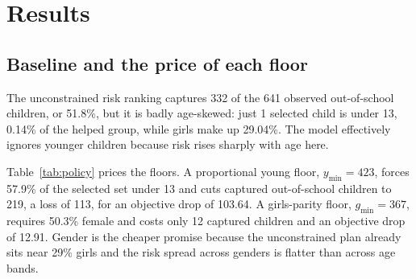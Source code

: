 \documentclass[12.1pt,a4paper]{article}
\begin{document}
\section{Results}

\subsection{Baseline and the price of each floor}

The unconstrained risk ranking captures 332 of the 641 observed out-of-school children, or 51.8\%, but it is badly age-skewed: just 1 selected child is under 13, 0.14\% of the helped group, while girls make up 29.04\%. The model effectively ignores younger children because risk rises sharply with age here.

Table~\ref{tab:policy} prices the floors. A proportional young floor, $y_{\min}=423$, forces 57.9\% of the selected set under 13 and cuts captured out-of-school children to 219, a loss of 113, for an objective drop of 103.64. A girls-parity floor, $g_{\min}=367$, requires 50.3\% female and costs only 12 captured children and an objective drop of 12.91. Gender is the cheaper promise because the unconstrained plan already sits near 29\% girls and the risk spread across genders is flatter than across age bands.
\end{document}
